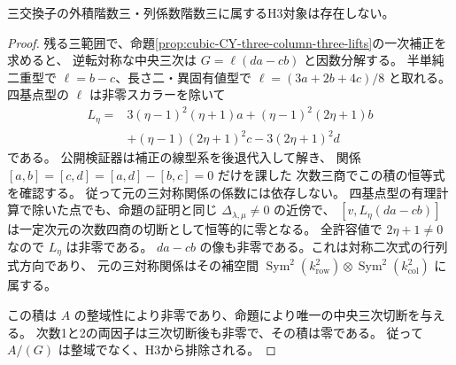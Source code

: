 \begin{theorem}\label{thm:cubic-CY-three-column-three-empty}
三交換子の外積階数三・列係数階数三に属するH3対象は存在しない。
\end{theorem}
\begin{proof}
残る三範囲で、命題\ref{prop:cubic-CY-three-column-three-lifts}の一次補正を求めると、
逆転対称な中央三次は $G=\ell(da-cb)$ と因数分解する。
半単純二重型で $\ell=b-c$、長さ二・異固有値型で
$\ell=(3a+2b+4c)/8$ と取れる。
四基点型の $\ell$ は非零スカラーを除いて
\begin{align*}
 L_\eta={}&3(\eta-1)^2(\eta+1)a+(\eta-1)^2(2\eta+1)b\\
          &+(\eta-1)(2\eta+1)^2c-3(2\eta+1)^2d
\end{align*}
である。
公開検証器は補正の線型系を後退代入して解き、
関係 $[a,b]=[c,d]=[a,d]-[b,c]=0$ だけを課した
次数三商でこの積の恒等式を確認する。
従って元の三対称関係の係数には依存しない。
四基点型の有理計算で除いた点でも、命題の証明と同じ
$\Delta_{\lambda,\mu}\ne0$ の近傍で、
$[v,L_\eta(da-cb)]$ は一定次元の次数四商の切断として恒等的に零となる。
全許容値で $2\eta+1\ne0$ なので $L_\eta$ は非零である。
$da-cb$ の像も非零である。これは対称二次式の行列式方向であり、
元の三対称関係はその補空間
$\operatorname{Sym}^2(k^2_{\mathrm{row}})\otimes
 \operatorname{Sym}^2(k^2_{\mathrm{col}})$ に属する。

この積は $A$ の整域性により非零であり、命題により唯一の中央三次切断を与える。
次数1と2の両因子は三次切断後も非零で、その積は零である。
従って $A/(G)$ は整域でなく、H3から排除される。
\end{proof}
